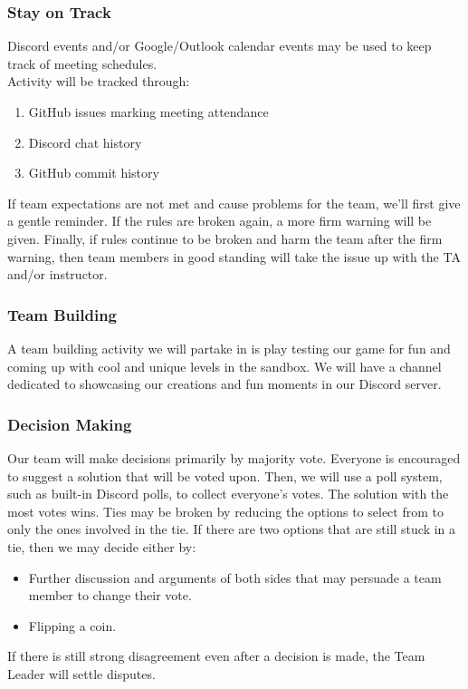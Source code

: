 \documentclass{article}
\begin{document}
\subsubsection*{Stay on Track}

Discord events and/or Google/Outlook calendar events may be used to keep track of meeting schedules.\\

Activity will be tracked through:
\begin{enumerate}
\item{GitHub issues marking meeting attendance}
\item{Discord chat history}
\item{GitHub commit history}
\end{enumerate}

If team expectations are not met and cause problems for the team, we'll first give a gentle reminder. If the rules are broken again, a more firm warning will be given. Finally, if rules continue to be broken and harm the team after the firm warning, then team members in good standing will take the issue up with the TA and/or instructor.


\subsubsection*{Team Building}

A team building activity we will partake in is play testing our game for fun and coming up with cool and unique levels in the sandbox. We will have a channel dedicated to showcasing our creations and fun moments in our Discord server.

\subsubsection*{Decision Making} 

Our team will make decisions primarily by majority vote. Everyone is encouraged to suggest a solution that will be voted upon. Then, we will use a poll system, such as built-in Discord polls, to collect everyone's votes. The solution with the most votes wins.
Ties may be broken by reducing the options to select from to only the ones involved in the tie. If there are two options that are still stuck in a tie, then we may decide either by:
\begin{itemize}
\item{Further discussion and arguments of both sides that may persuade a team member to change their vote.}
\item{Flipping a coin.}
\end{itemize}
If there is still strong disagreement even after a decision is made, the Team Leader will settle disputes.
\end{document}
